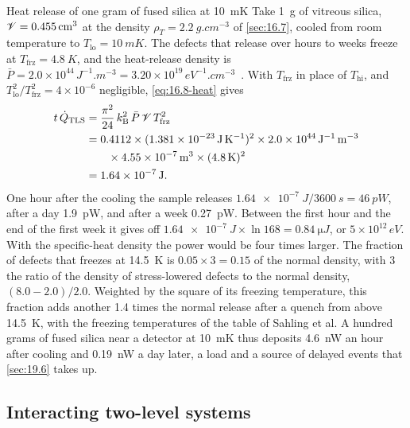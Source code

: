 \begin{workedexample}{Heat release of one gram of fused silica at \SI{10}{mK}}\label{we:16-heat}
Take \SI{1}{g} of vitreous silica, $\mathscr{V} = \SI{0.455}{cm^3}$ at the density $\rho_T = \SI{2.2}{g.cm^{-3}}$ of \cref{sec:16.7}, cooled from room temperature to $T_{\mathrm{lo}} = \SI{10}{mK}$. The defects that release over hours to weeks freeze at $T_{\mathrm{frz}} = \SI{4.8}{K}$, and the heat-release density is $\bar P = 2.0\times10^{44}\,\si{J^{-1}.m^{-3}} = 3.20\times10^{19}\,\si{eV^{-1}.cm^{-3}}$~\cite[Table~1]{sahling2014anomalous}. With $T_{\mathrm{frz}}$ in place of $T_{\mathrm{hi}}$, and $T_{\mathrm{lo}}^2/T_{\mathrm{frz}}^2 = 4\times10^{-6}$ negligible, \cref{eq:16.8-heat} gives
\begin{equation*}
  \begin{split}
  t\,\dot Q_{\mathrm{TLS}} &= \frac{\pi^2}{24}\,k_{\mathrm{B}}^2\,\bar P\,\mathscr{V}\,T_{\mathrm{frz}}^2 \\
  &= 0.4112\times(\SI{1.381e-23}{J.K^{-1}})^2\times\SI{2.0e44}{J^{-1}.m^{-3}} \\
  &\qquad\times\SI{4.55e-7}{m^3}\times(\SI{4.8}{K})^2 \\
  &= \SI{1.64e-7}{J} .
  \end{split}
\end{equation*}
One hour after the cooling the sample releases $\SI{1.64e-7}{J}/\SI{3600}{s} = \SI{46}{pW}$, after a day \SI{1.9}{pW}, and after a week \SI{0.27}{pW}. Between the first hour and the end of the first week it gives off $\SI{1.64e-7}{J}\times\ln168 = \SI{0.84}{\micro J}$, or $5\times10^{12}\,\si{eV}$. With the specific-heat density the power would be four times larger. The fraction of defects that freezes at \SI{14.5}{K} is $0.05\times3 = 0.15$ of the normal density, with 3 the ratio of the density of stress-lowered defects to the normal density, $(8.0 - 2.0)/2.0$. Weighted by the square of its freezing temperature, this fraction adds another 1.4 times the normal release after a quench from above \SI{14.5}{K}, with the freezing temperatures of the table of Sahling et al. A hundred grams of fused silica near a detector at \SI{10}{mK} thus deposits \SI{4.6}{nW} an hour after cooling and \SI{0.19}{nW} a day later, a load and a source of delayed events that \cref{sec:19.6} takes up.
\end{workedexample}

\subsection{Interacting two-level systems}\label{sec:16.8-open}

